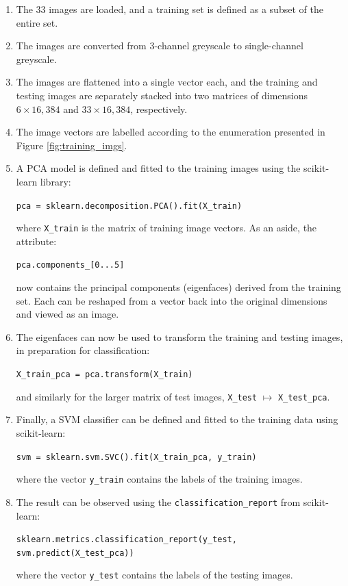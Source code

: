 \begin{enumerate}
  \item The 33 images are loaded, and a training set is defined as a subset of the entire set.

  \item The images are converted from 3-channel greyscale to single-channel greyscale.

  \item The images are flattened into a single vector each, and the training and testing images are separately stacked into two matrices of dimensions $6\times16,384$ and $33\times16,384$, respectively.

  \item The image vectors are labelled according to the enumeration presented in Figure \ref{fig:training_imgs}.

  \item A PCA model is defined and fitted to the training images using the scikit-learn library:
  \begin{center}
    \texttt{pca = sklearn.decomposition.PCA().fit(X\_train)}
  \end{center}
  where \texttt{X\_train} is the matrix of training image vectors. As an aside, the attribute:
  \begin{center}
    \texttt{pca.components\_[0...5]}
  \end{center}
  now contains the principal components (eigenfaces) derived from the training set. Each can be reshaped from a vector back into the original dimensions and viewed as an image.

  \item The eigenfaces can now be used to transform the training and testing images, in preparation for classification:
  \begin{center}
    \texttt{X\_train\_pca = pca.transform(X\_train)}
  \end{center}
  and similarly for the larger matrix of test images, \texttt{X\_test} $\mapsto$ \texttt{X\_test\_pca}.

  \item Finally, a SVM classifier can be defined and fitted to the training data using scikit-learn:
  \begin{center}
    \texttt{svm = sklearn.svm.SVC().fit(X\_train\_pca, y\_train)}
  \end{center}
  where the vector \texttt{y\_train} contains the labels of the training images.

  \item The result can be observed using the \texttt{classification\_report} from scikit-learn:
  \begin{center}
    \texttt{sklearn.metrics.classification\_report(y\_test, svm.predict(X\_test\_pca))}
  \end{center}
  where the vector \texttt{y\_test} contains the labels of the testing images.

\end{enumerate}

